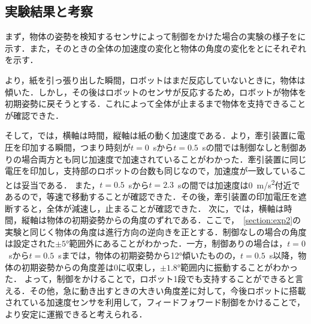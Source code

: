 \subsection{実験結果と考察}
まず，物体の姿勢を検知するセンサによって制御をかけた場合の実験の様子をに示す．また，そのときの全体の加速度の変化と物体の角度の変化をとにそれぞれを示す．

より，紙を引っ張り出した瞬間，ロボットはまだ反応していないときに，物体は傾いた．しかし，その後はロボットのセンサが反応するため，ロボットが物体を初期姿勢に戻そうとする．これによって全体が止まるまで物体を支持できることが確認できた．

そして，では，横軸は時間，縦軸は紙の動く加速度である．より，牽引装置に電圧を印加する瞬間，つまり時刻が$t=0$~sから$t=0.5$~sの間では制御なしと制御ありの場合両方とも同じ加速度で加速されていることがわかった．牽引装置に同じ電圧を印加し，支持部のロボットの台数も同じなので，加速度が一致していることは妥当である．
また，$t=0.5$~sから$t=2.3$~sの間では加速度は0~\si{m/s^2}付近であるので，等速で移動することが確認できた．その後，牽引装置の印加電圧を遮断すると，全体が減速し，止まることが確認できた．
次に，では，横軸は時間，縦軸は物体の初期姿勢からの角度のずれである．ここで，~\ref{section:exp2}の実験と同じく物体の角度は進行方向の逆向きを正とする．制御なしの場合の角度は設定された$\pm5$\si{\degree}範囲外にあることがわかった．一方，制御ありの場合は，$t=0$~sから$t=0.5$~sまでは，物体の初期姿勢から12\si{\degree}傾いたものの，$t=0.5$~s以降，物体の初期姿勢からの角度差は0に収束し，$\pm1.8$\si{\degree}範囲内に振動することがわかった．
よって，制御をかけることで，ロボット1段でも支持することができると言える．その他，急に動き出すときの大きい角度差に対して，今後ロボットに搭載されている加速度センサを利用して，フィードフォワード制御をかけることで，より安定に運搬できると考えられる．

